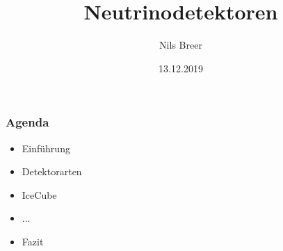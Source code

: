 \documentclass[aspectratio=1610, 9pt]{beamer}
\title{Neutrinodetektoren}
\author[N.Breer]{Nils Breer}
\institute{Fakultät Physik}
\date{13.12.2019}
\begin{document}
\maketitle

\begin{frame}\frametitle{Agenda}
  \begin{itemize}
    \item Einf\"uhrung
    \item Detektorarten
    \item IceCube
    \item ...
    \item Fazit
  \end{itemize}
\end{frame}
\end{document}
